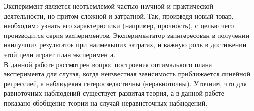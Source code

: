 Эксперимент является неотъемлемой частью научной и практической деятельности, но притом сложной и затратной. Так, произведя новый товар, необходимо узнать его характеристики (например, прочность), с целью чего производится серия экспериментов. Экспериментатор заинтересован в получении наилучших результатов при наименьших затратах, и важную роль в достижении этой цели играет план эксперимента.\\

В данной работе рассмотрен вопрос  построения оптимального плана эксперимента для случая, когда неизвестная зависимость приближается линейной регрессией, а наблюдения гетероскедастичны (неравноточны). Уточним, что для равноточных наблюдений существует развитая теория, а в данной работе показано обобщение теории на случай неравноточных наблюдений.